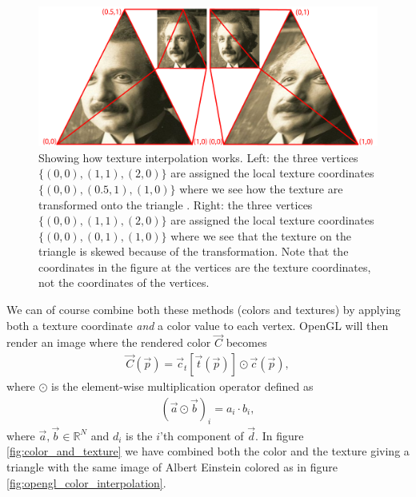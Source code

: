 \begin{figure}[h]
\begin{center}
\includegraphics[width=\textwidth, trim=0cm 0cm 0cm 0cm, clip]{opengl/figures/texture_interpolation.png}
\end{center}
\caption{Showing how texture interpolation works. Left: the three vertices $\{(0,0), (1,1), (2,0)\}$ are assigned the local texture coordinates $\{(0,0), (0.5,1), (1,0)\}$ where we see how the texture are transformed onto the triangle . Right: the three vertices $\{(0,0), (1,1), (2,0)\}$ are assigned the local texture coordinates $\{(0,0), (0,1), (1,0)\}$ where we see that the texture on the triangle is skewed because of the transformation. Note that the coordinates in the figure at the vertices are the texture coordinates, not the coordinates of the vertices.}
\label{fig:opengl_texture_interpolation}
\end{figure}
We can of course combine both these methods (colors and textures) by applying both a texture coordinate \textit{and} a color value to each vertex. OpenGL will then render an image where the rendered color $\vec C$ becomes
\begin{align}
	\label{eq:opengl_combining_colors_textures}
	\vec C(\vec p) = \vec c_t[\vec t(\vec p)] \odot \vec c(\vec p),
\end{align}
where $\odot$ is the element-wise multiplication operator defined as
\begin{align}
	(\vec a \odot \vec b)_i = a_i\cdot b_i,
\end{align}
where $\vec a,\vec b \in \mathbb{R}^N$ and $d_i$ is the $i$'th component of $\vec d$. In figure \ref{fig:color_and_texture} we have combined both the color and the texture giving a triangle with the same image of Albert Einstein colored as in figure \ref{fig:opengl_color_interpolation}.
